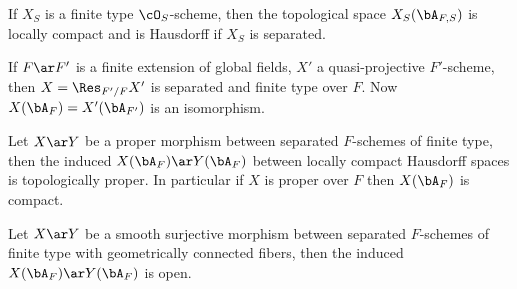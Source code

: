 \begin{cor}
  If $X_{S}$ is a finite type $\cO_{S}$-scheme, then the topological space $X_{S}(\bA_{F,S})$ is locally compact and is Hausdorff if $X_{S}$ is separated.


  If $F\ar F'$ is a finite extension of global fields, $X'$ a quasi-projective $F'$-scheme, then $X=\Res_{F'/F}X'$ is separated and finite type over $F$. Now $X(\bA_{F})=X'(\bA_{F'})$ is an isomorphism.
\end{cor}


\begin{prp}
  Let $X\ar Y$ be a proper morphism between separated $F$-schemes of finite type, then the induced $X(\bA_{F})\ar Y(\bA_{F})$ between locally compact Hausdorff spaces is topologically proper. In particular if $X$ is proper over $F$ then $X(\bA_{F})$ is compact.
\end{prp}


\begin{thm}
  Let $X\ar Y$ be a smooth surjective morphism between separated $F$-schemes of finite type with geometrically connected fibers, then the induced $X(\bA_{F})\ar Y(\bA_{F})$ is open.
\end{thm}










